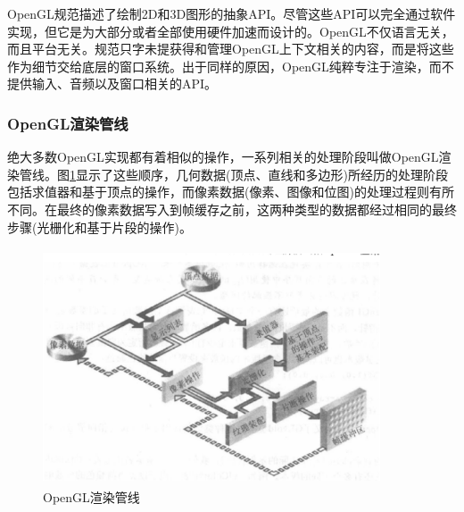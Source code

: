 OpenGL规范描述了绘制2D和3D图形的抽象API。尽管这些API可以完全通过软件实现，但它是为大部分或者全部使用硬件加速而设计的。OpenGL不仅语言无关，而且平台无关。规范只字未提获得和管理OpenGL上下文相关的内容，而是将这些作为细节交给底层的窗口系统。出于同样的原因，OpenGL纯粹专注于渲染，而不提供输入、音频以及窗口相关的API\cite{OpenGL-Wiki}。

\subsubsection{OpenGL渲染管线}

绝大多数OpenGL实现都有着相似的操作，一系列相关的处理阶段叫做OpenGL渲染管线。图\ref{fig:OpenGL-Pipeline}显示了这些顺序，几何数据(顶点、直线和多边形)所经历的处理阶段包括求值器和基于顶点的操作，而像素数据(像素、图像和位图)的处理过程则有所不同。在最终的像素数据写入到帧缓存之前，这两种类型的数据都经过相同的最终步骤(光栅化和基于片段的操作)\cite{OpenGL-Programming-Guide}。

\begin{figure}[H] 
  \centering
  \includegraphics[width=10cm,height=7cm]{figures/chap01/OpenGL-Pipeline}
  \caption{OpenGL渲染管线}
  \label{fig:OpenGL-Pipeline}
\end{figure}

